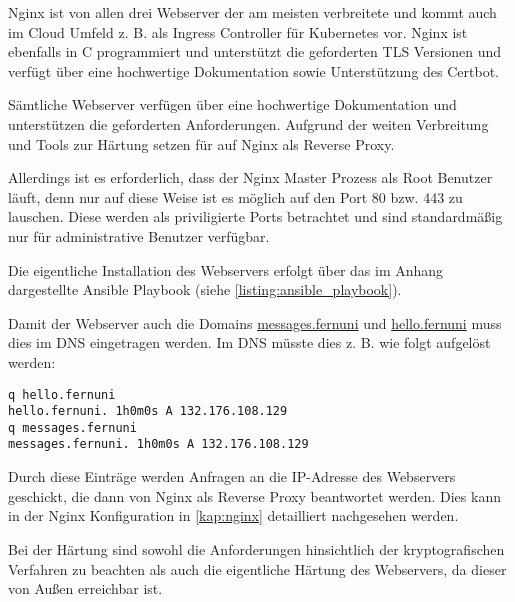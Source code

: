 Nginx ist von allen drei Webserver der am meisten verbreitete und kommt auch im Cloud Umfeld z. B. als Ingress Controller für Kubernetes vor. Nginx ist ebenfalls in C programmiert und unterstützt die geforderten \ac{TLS} Versionen und verfügt über eine hochwertige Dokumentation sowie Unterstützung des Certbot.

Sämtliche Webserver verfügen über eine hochwertige Dokumentation und unterstützen die geforderten Anforderungen. Aufgrund der weiten Verbreitung und Tools zur Härtung setzen für auf Nginx als Reverse Proxy.

Allerdings ist es erforderlich, dass der Nginx Master Prozess als Root Benutzer läuft, denn nur auf diese Weise ist es möglich auf den Port 80 bzw. 443 zu lauschen. Diese werden als priviligierte Ports betrachtet und sind standardmäßig nur für administrative Benutzer verfügbar.

Die eigentliche Installation des Webservers erfolgt über das im Anhang dargestellte Ansible Playbook (siehe \autoref{listing:ansible_playbook}).

Damit der Webserver auch die Domains \url{messages.fernuni} und \url{hello.fernuni} muss dies im \ac*{DNS} eingetragen werden. Im \ac{DNS} müsste dies z. B. wie folgt aufgelöst werden:

\begin{verbatim}
q hello.fernuni
hello.fernuni. 1h0m0s A 132.176.108.129
q messages.fernuni
messages.fernuni. 1h0m0s A 132.176.108.129
\end{verbatim}

Durch diese Einträge werden Anfragen an die IP-Adresse des Webservers geschickt, die dann von Nginx als Reverse Proxy beantwortet werden. Dies kann in der Nginx Konfiguration in \autoref{kap:nginx} detailliert nachgesehen werden.

Bei der Härtung sind sowohl die Anforderungen hinsichtlich der kryptografischen Verfahren zu beachten als auch die eigentliche Härtung des Webservers, da dieser von Außen erreichbar ist.




